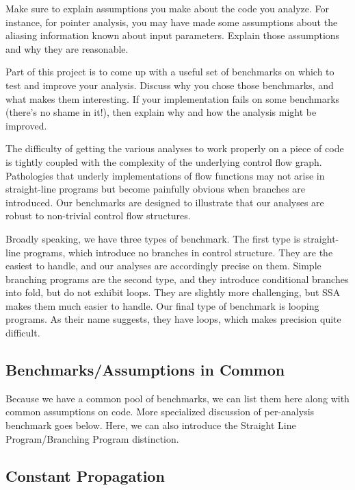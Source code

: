 \documentclass{article}
\theoremstyle{definition}
\begin{document}
\begin{framed}
  Make sure to explain assumptions you make about the code you
  analyze. For instance, for pointer analysis, you may have made some
  assumptions about the aliasing information known about input
  parameters. Explain those assumptions and why they are reasonable.

  Part of this project is to come up with a useful set of benchmarks
  on which to test and improve your analysis. Discuss why you chose
  those benchmarks, and what makes them interesting. If your
  implementation fails on some benchmarks (there's no shame in it!),
  then explain why and how the analysis might be improved.
\end{framed}

The difficulty of getting the various analyses to work properly on a
piece of code is tightly coupled with the complexity of the underlying
control flow graph. Pathologies that underly implementations of flow
functions may not arise in straight-line programs but become painfully
obvious when branches are introduced. Our benchmarks are designed to
illustrate that our analyses are robust to non-trivial control flow
structures.

Broadly speaking, we have three types of benchmark. The first type is
straight-line programs, which introduce no branches in control
structure. They are the easiest to handle, and our analyses are
accordingly precise on them. Simple branching programs are the second
type, and they introduce conditional branches into fold, but do not
exhibit loops. They are slightly more challenging, but SSA makes them
much easier to handle. Our final type of benchmark is looping
programs. As their name suggests, they have loops, which makes
precision quite difficult.

\subsection{Benchmarks/Assumptions in Common}
Because we have a common pool of benchmarks, we can list them here
along with common assumptions on code. More specialized discussion of
per-analysis benchmark goes below. Here, we can also introduce the
Straight Line Program/Branching Program distinction.

\subsection{Constant Propagation}
\end{document}
